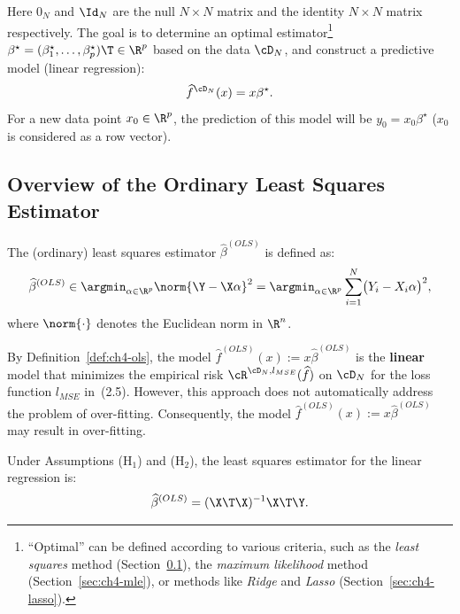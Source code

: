 Here $0_N$ and $\Id_N$ are the null $N \times N$ matrix and the identity $N \times N$ matrix
respectively. The goal is to determine an optimal estimator\footnote{``Optimal'' can be defined according to various criteria, such as the \emph{least squares} method (Section~\ref{sec:ch4-ols}), the \emph{maximum likelihood} method (Section~\ref{sec:ch4-mle}), or methods like \emph{Ridge} and \emph{Lasso} (Section~\ref{sec:ch4-lasso}).}
$\beta^\star = (\beta_1^\star, \ldots, \beta_p^\star)\T \in \R^p$ based on the data $\cD_N$, and construct a predictive model (linear regression):
\begin{equation}\label{eq:ch4-predictor}
\widehat{f}^{\cD_N}(x) = x \beta^\star.
\end{equation}
For a new data point $x_0 \in \R^p$, the prediction of this model will be $y_0 = x_0 \beta^\star$
($x_0$ is considered as a row vector).

\subsection{Overview of the Ordinary Least Squares Estimator}\label{sec:ch4-ols}

\begin{definition}\label{def:ch4-ols}
The (ordinary) least squares estimator $\widehat{\beta}^{(OLS)}$ is defined as:
\begin{equation}\label{eq:ch4-ols-def}
\widehat{\beta}^{(OLS)} \in \argmin_{\alpha \in \R^p} \norm{\Y - \X \alpha}^2
= \argmin_{\alpha \in \R^p} \sum_{i=1}^N \bigl(Y_i - X_i \alpha\bigr)^2,
\end{equation}
where $\norm{\cdot}$ denotes the Euclidean norm in $\R^n$.
\end{definition}

\begin{remark}
By Definition~\ref{def:ch4-ols}, the model $\widehat{f}^{(OLS)}(x) := x \widehat{\beta}^{(OLS)}$ is the
\textbf{linear} model that minimizes the empirical risk $\cR^{\cD_N, l_{MSE}}(\widehat{f})$ on $\cD_N$ for the
loss function $l_{MSE}$ in~(2.5).
However, this approach does not automatically address the problem of over-fitting.
Consequently, the model $\widehat{f}^{(OLS)}(x) := x \widehat{\beta}^{(OLS)}$ may result in over-fitting.
\end{remark}

\begin{proposition}\label{prop:ch4-ols-formula}
Under Assumptions (H$_1$) and (H$_2$), the least squares estimator for the linear regression is:
\begin{equation}\label{eq:ch4-ols-formula}
\widehat{\beta}^{(OLS)} = (\X\T \X)^{-1} \X\T \Y.
\end{equation}
\end{proposition}

